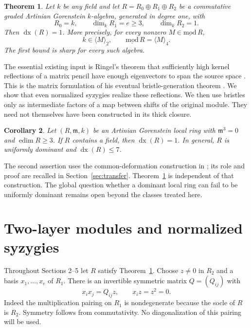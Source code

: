 \documentclass[11pt]{article}
\newtheorem{theorem}{Theorem}[section]
\newtheorem{corollary}[theorem]{Corollary}
\theoremstyle{definition}\newtheorem{definition}[theorem]{Definition}
\theoremstyle{remark}\newtheorem{remark}[theorem]{Remark}
\newcommand{\m}{\mathfrak m}
\newcommand{\dx}{\operatorname{dx}}
\newcommand{\edim}{\operatorname{edim}}
\begin{document}
\begin{theorem}\label{thm:main}
Let $k$ be any field and let $R=R_0\oplus R_1\oplus R_2$ be a commutative graded Artinian Gorenstein $k$-algebra, generated in degree one, with
\[
 R_0=k,\qquad \dim_kR_1=e\ge3,\qquad \dim_kR_2=1.
\]
Then $\dx(R)=1$. More precisely, for every nonzero $M\in\underline{\mathrm{mod}}\,R$,
\[
 k\in\langle M\rangle_2,
 \qquad \underline{\mathrm{mod}}\,R=\langle M\rangle_4.
\]
The first bound is sharp for every such algebra.
\end{theorem}

The essential existing input is Ringel's theorem that sufficiently high kernel reflections of a matrix pencil have enough eigenvectors to span the source space \cite[Section 5, Theorem 2]{RP}. This is the matrix formulation of his eventual bristle-generation theorem \cite[Main Theorem 1.3]{RB}. We show that even normalized syzygies realize these reflections. We then use bristles only as intermediate factors of a map between shifts of the original module. They need not themselves have been constructed in its thick closure.

\begin{corollary}\label{cor:arbitrary}
Let $(R,\m,k)$ be an Artinian Gorenstein local ring with $\m^3=0$ and $\edim R\ge3$. If $R$ contains a field, then $\dx(R)=1$. In general, $R$ is uniformly dominant and $\dx(R)\le7$.
\end{corollary}

The second assertion uses the common-deformation construction in \cite{Z}; its role and proof are recalled in Section~\ref{sec:transfer}. Theorem~\ref{thm:main} is independent of that construction. The global question whether a dominant local ring can fail to be uniformly dominant \cite[Question 6.12]{T} remains open beyond the classes treated here.

\section{Two-layer modules and normalized syzygies}
Throughout Sections 2--5 let $R$ satisfy Theorem~\ref{thm:main}. Choose $z\ne0$ in $R_2$ and a basis $x_1,\ldots,x_e$ of $R_1$. There is an invertible symmetric matrix $Q=(Q_{ij})$ with
\begin{equation}\label{eq:ring}
 x_ix_j=Q_{ij}z,\qquad x_iz=z^2=0.
\end{equation}
Indeed the multiplication pairing on $R_1$ is nondegenerate because the socle of $R$ is $R_2$. Symmetry follows from commutativity. No diagonalization of this pairing will be used.
\end{document}

